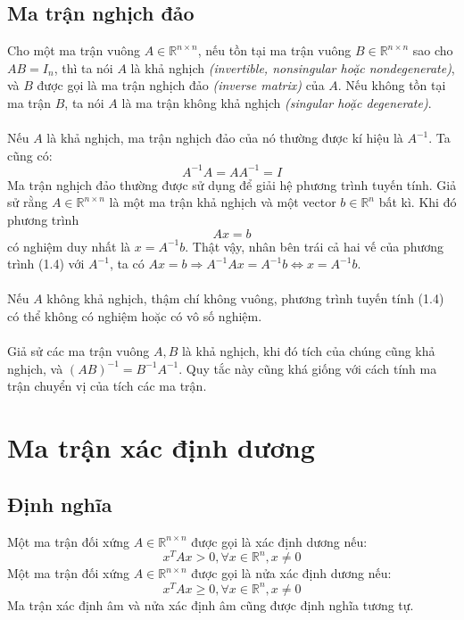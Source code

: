 \documentclass[12pt,a4paper]{report}
\begin{document}
	\subsection{Ma trận nghịch đảo}
	Cho một ma trận vuông $A \in \mathbb{R}^{n \times n}$, nếu tồn tại ma trận vuông $B \in \mathbb{R}^{n \times n}$ sao cho $AB = I_n$, thì ta nói $A$ là khả nghịch \textit{(invertible, nonsingular hoặc nondegenerate)}, và $B$ được gọi là ma trận nghịch đảo \textit{(inverse matrix)} của $A$. Nếu không tồn tại ma trận $B$, ta nói $A$ là ma trận không khả nghịch \textit{(singular hoặc degenerate)}.\\\\
	Nếu $A$ là khả nghịch, ma trận nghịch đảo của nó thường được kí hiệu là $A^{-1}$. Ta cũng có:
	\begin{equation}
		A^{-1}A = AA^{-1} = I
	\end{equation}
	Ma trận nghịch đảo thường được sử dụng để giải hệ phương trình tuyến tính. Giả sử rằng $A \in \mathbb{R}^{n \times n}$ là một ma trận khả nghịch và một vector $b \in \mathbb{R}^n$ bất kì. Khi đó phương trình \begin{equation}
		Ax = b
	\end{equation} có nghiệm duy nhất là $x = A^{-1}b$. Thật vậy, nhân bên trái cả hai vế của phương trình (1.4) với $A^{-1}$, ta có $Ax=b \Rightarrow A^{-1}Ax = A^{-1}b \Leftrightarrow x = A^{-1}b$.
	\\\\Nếu $A$ không khả nghịch, thậm chí không vuông, phương trình tuyến tính (1.4) có thể không có nghiệm hoặc có vô số nghiệm.\\\\
	Giả sử các ma trận vuông $A, B$ là khả nghịch, khi đó tích của chúng cũng khả nghịch, và $(AB)^{-1} = B^{-1}A^{-1}$. Quy tắc này cũng khá giống với cách tính ma trận chuyển vị của tích các ma trận.
	
	\section{Ma trận xác định dương}
	\subsection{Định nghĩa}
	Một ma trận đối xứng $A \in \mathbb{R}^{n \times n}$ được gọi là xác định dương nếu: $$x^TAx > 0, \forall x\in \mathbb{R}^n, x \neq 0$$
	Một ma trận đối xứng $A \in \mathbb{R}^{n \times n}$ được gọi là nửa xác định dương nếu: $$x^TAx \geq 0, \forall x\in \mathbb{R}^n, x \neq 0$$
	Ma trận xác định âm và nửa xác định âm cũng được định nghĩa tương tự.	
\end{document}

